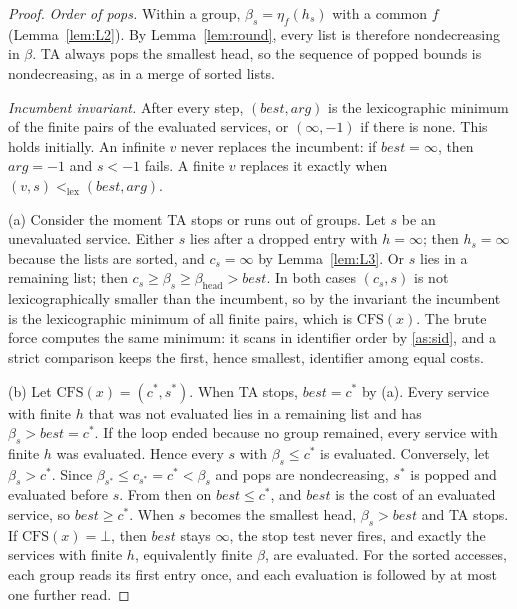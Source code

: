 \documentclass[11pt]{article}
\theoremstyle{definition}
\theoremstyle{remark}
\newcommand{\lexlt}{\mathrel{<_{\mathrm{lex}}}}
\newcommand{\cfs}{\mathrm{CFS}}
\begin{document}
\begin{proof}
\emph{Order of pops.} Within a group, $\beta_s=\eta_f(h_s)$ with a common $f$
(Lemma~\ref{lem:L2}). By Lemma~\ref{lem:round}, every list is therefore nondecreasing in
$\beta$. TA always pops the smallest head, so the sequence of popped bounds is
nondecreasing, as in a merge of sorted lists.

\emph{Incumbent invariant.} After every step, $(\mathit{best},\mathit{arg})$ is the
lexicographic minimum of the finite pairs of the evaluated services, or $(\infty,-1)$ if
there is none. This holds initially. An infinite $v$ never replaces the incumbent: if
$\mathit{best}=\infty$, then $\mathit{arg}=-1$ and $s<-1$ fails. A finite $v$ replaces it
exactly when $(v,s)\lexlt(\mathit{best},\mathit{arg})$.

(a) Consider the moment TA stops or runs out of groups. Let $s$ be an unevaluated
service. Either $s$ lies after a dropped entry with $h=\infty$; then $h_s=\infty$ because the
lists are sorted, and $c_s=\infty$ by Lemma~\ref{lem:L3}. Or $s$ lies in a remaining list;
then $c_s\ge\beta_s\ge\beta_{\mathrm{head}}>\mathit{best}$. In both cases $(c_s,s)$ is not
lexicographically smaller than the incumbent, so by the invariant the incumbent is the
lexicographic minimum of all finite pairs, which is $\cfs(x)$. The brute force computes
the same minimum: it scans in identifier order by \ref{as:sid}, and a strict comparison
keeps the first, hence smallest, identifier among equal costs.

(b) Let $\cfs(x)=(c^*,s^*)$. When TA stops, $\mathit{best}=c^*$ by (a). Every service
with finite $h$ that was not evaluated lies in a remaining list and has
$\beta_s>\mathit{best}=c^*$. If the loop ended because no group remained, every service with
finite $h$ was evaluated. Hence every $s$ with $\beta_s\le c^*$ is evaluated. Conversely,
let $\beta_s>c^*$. Since $\beta_{s^*}\le c_{s^*}=c^*<\beta_s$ and pops are nondecreasing,
$s^*$ is popped and evaluated before $s$. From then on $\mathit{best}\le c^*$, and $\mathit{best}$
is the cost of an evaluated service, so $\mathit{best}\ge c^*$. When $s$ becomes the
smallest head, $\beta_s>\mathit{best}$ and TA stops. If $\cfs(x)=\bot$, then $\mathit{best}$
stays $\infty$, the stop test never fires, and exactly the services with finite $h$,
equivalently finite $\beta$, are evaluated. For the sorted accesses, each group reads its
first entry once, and each evaluation is followed by at most one further read.


\end{proof}
\end{document}
